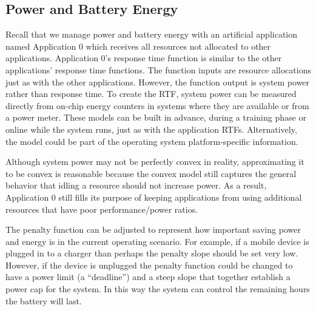 \subsection*{Power and Battery Energy}
Recall that we manage power and battery energy with an artificial application named Application 0 which receives all resources not allocated to other applications. Application 0's response time function is similar to the other applications' response time functions.  The function inputs are resource allocations just as with the other applications.  However, the function output is system power rather than response time.   To create the RTF, system power can be measured directly from on-chip energy counters in systems where they are available or from a power meter.  These models can be built in advance, during a training phase or online while the system runs, just as with the application RTFs.  Alternatively, the model could be part of the operating system platform-specific information.

Although system power may not be perfectly convex in reality, approximating it to be convex is reasonable because the convex model still captures the general behavior that idling a resource should not increase power.  As a result, Application 0 still fills its purpose of keeping applications from using additional resources that have poor performance/power ratios.

The penalty function can be adjusted to represent how important saving power and energy is in the current operating scenario.  For example, if a mobile device is plugged in to a charger than perhaps the penalty slope should be set very low.  However, if the device is unplugged the penalty function could be changed to have a power limit (a ``deadline'') and a steep slope that together establish a power cap for the system.  In this way the system can control the remaining hours the battery will last.

